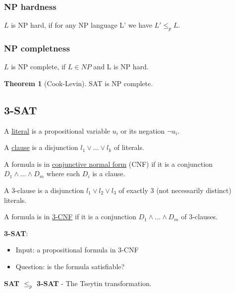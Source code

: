 \documentclass[a4paper,12pt]{article}
\theoremstyle{definition}
\newtheorem{theorem}[counter]{Theorem}
\theoremstyle{remark}
\begin{document}
\subsubsection*{NP hardness}

$L$ is NP hard, if for any NP language L' we have $L' \leq_p L$.

\subsubsection*{NP completness}

$L$ is NP complete, if $L \in NP$ and L is NP hard.

\begin{theorem}[Cook-Levin]
    SAT is NP complete.
\end{theorem}

\subsection{3-SAT}

A \underline{literal} is a propositional variable $u_i$ or its negation $\neg u_i$.

A \underline{clause} is a disjunction $l_1 \lor \dots \lor l_k$ of literals.

A formula is in \underline{conjunctive normal form} (CNF) if it is a conjunction $D_1 \land \dots \land D_m$ where each $D_i$ is a clause.

A 3-clause is a disjunction $l_1 \lor l_2 \lor l_3$ of exactly 3 (not necessarily distinct) literals.

A formula is in \underline{3-CNF} if it is a conjunction $D_1 \land \dots \land D_m$ of 3-clauses.

\textbf{3-SAT}:
\begin{itemize}
    \item Input: a propositional formula in 3-CNF
    \item Question: is the formula satisfiable?
\end{itemize}

\textbf{SAT $\leq_p$ 3-SAT} - The Tseytin transformation.
\end{document}
